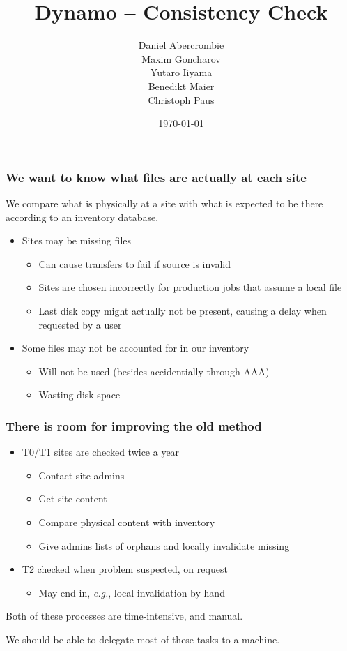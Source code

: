 \documentclass{beamer}
\author[Dynamo Team]{
  \underline{Daniel Abercrombie} \\
  Maxim Goncharov \\
  Yutaro Iiyama \\
  Benedikt Maier \\
  Christoph Paus
}
\title{\bf \sffamily Dynamo -- Consistency Check}
\date{\today}
\begin{document}
\begin{frame}[nonumbering]
  \titlepage
\end{frame}

\begin{frame}
  \frametitle{We want to know what files are actually at each site}

  We compare what is physically at a site with what is
  expected to be there according to an inventory database.

  \begin{itemize}
  \item Sites may be missing files
    \begin{itemize}
    \item Can cause transfers to fail if source is invalid
    \item Sites are chosen incorrectly for production jobs
      that assume a local file
    \item Last disk copy might actually not be present,
      causing a delay when requested by a user
    \end{itemize}
  \item Some files may not be accounted for in our inventory
    \begin{itemize}
    \item Will not be used (besides accidentially through AAA)
    \item Wasting disk space
    \end{itemize}
  \end{itemize}

\end{frame}

\begin{frame}
  \frametitle{There is room for improving the old method}

  \begin{itemize}
  \item T0/T1 sites are checked twice a year
    \begin{itemize}
    \item Contact site admins
    \item Get site content
    \item Compare physical content with inventory
    \item Give admins lists of orphans and locally invalidate missing
    \end{itemize}
  \item T2 checked when problem suspected, on request
    \begin{itemize}
    \item May end in, \emph{e.g.}, local invalidation by hand
    \end{itemize}
  \end{itemize}

  Both of these processes are time-intensive, and manual.

  We should be able to delegate most of these tasks to a machine.

\end{frame}
\end{document}
